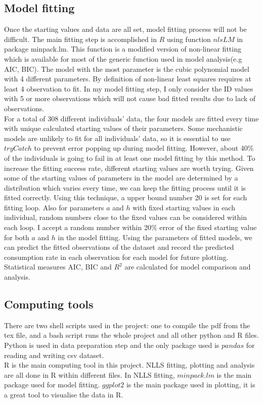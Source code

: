 \documentclass{article}[11pt,a4,twosided,doublespacing,titlepagenumber=on,numbers=endperiod]
\begin{document}
\subsection{Model fitting}
Once the starting values and data are all set, model fitting process will not be difficult. The main fitting step is accomplished in $R$ using function $nlsLM$ in package minpack.lm\cite{elzhov2016package}. This function is a modified version of non-linear fitting which is available for most of the generic function used in model analysis(e.g AIC, BIC). The model with the most parameter is the cubic polynomial model with 4 different parameters. By definition of non-linear least squares requires at least 4 observation to fit. In my model fitting step, I only consider the ID values with 5 or more observations which will not cause bad fitted results due to lack of observations. \\
\noindent
For a total of 308 different individuals' data, the four models are fitted every time with unique calculated starting values of their parameters. Some mechanistic models are unlikely to fit for all individuals' data, so it is essential to use $tryCatch$ to prevent error popping up during model fitting. However, about 40\% of the individuals is going to fail in at least one model fitting by this method. To increase the fitting success rate, different starting values are worth trying. Given some of the starting values of parameters in the model are determined by a distribution which varies every time, we can keep the fitting process until it is fitted correctly. Using this technique, a upper bound number 20 is set for each fitting loop. Also for parameters $a$ and $h$ with fixed starting values in each individual, random numbers close to the fixed values can be considered within each loop. I accept a random number within 20\% error of the fixed starting value for both $a$ and $h$ in the model fitting. Using the parameters of fitted models, we can predict the fitted observations of the dataset and record the predicted consumption rate in each observation for each model for future plotting. Statistical measures AIC, BIC and $R^2$ are calculated for model comparison and analysis.

\subsection{Computing tools}
There are two shell scripts used in the project: one to compile the pdf from the tex file, and a bash script runs the whole project and all other python and R files. \\
\noindent
Python is used in data preparation step and the only package used is $pandas$ for reading and writing csv dataset.\\
\noindent
R is the main computing tool in this project. NLLS fitting, plotting and analysis are all done in R within different files. In NLLS fitting, $minpack.lm$ is the main package used for model fitting. $ggplot2$ is the main package used in plotting, it is a great tool to visualise the data in R.
\end{document}
